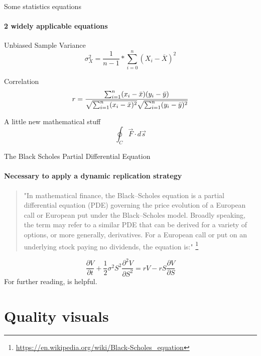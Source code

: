 \documentclass{beamer}
\begin{document}
\begin{frame}{Some statistics equations}
\framesubtitle{2 widely applicable equations}
\begin{block}{Unbiased Sample Variance}
    \begin{equation}
       \sigma_X^2 =\frac{1}{n-1}*\sum_{i=0}^n (X_i-\overline{X})^2
    \end{equation}
\end{block}


\begin{block}{Correlation}
    \begin{equation}
  r =
  \frac{ \sum_{i=1}^{n}(x_i-\bar{x})(y_i-\bar{y}) }{%
        \sqrt{\sum_{i=1}^{n}(x_i-\bar{x})^2}\sqrt{\sum_{i=1}^{n}(y_i-\bar{y})^2}}
\end{equation}
\end{block}

\begin{block}{A little new mathematical stuff}
  \begin{equation}
      \oint_{C} \vec{F} \cdot d\vec{s}
  \end{equation}
\end{block}



\end{frame}

\begin{frame}{The Black Scholes Partial Differential Equation}
\framesubtitle{Necessary to apply a dynamic replication strategy}
\begin{quote}
"In mathematical finance, the Black–Scholes equation is a partial differential equation (PDE) governing the price evolution of a European call or European put under the Black–Scholes model. Broadly speaking, the term may refer to a similar PDE that can be derived for a variety of options, or more generally, derivatives.
For a European call or put on an underlying stock paying no dividends, the equation is:" \footnote{\url{https://en.wikipedia.org/wiki/Black-Scholes_equation}}
\end{quote}

\begin{equation}
     \frac{\partial V}{\partial t} + \frac{1}{2} \sigma^2 S^2 \frac{\partial^2 V}{\partial S^2}
 = rV - rS \frac{\partial V}{\partial S}
\end{equation}
\bigbreak
For further reading, \cite{Black1973} is helpful.
\end{frame}

\section{Quality visuals}
\end{document}
